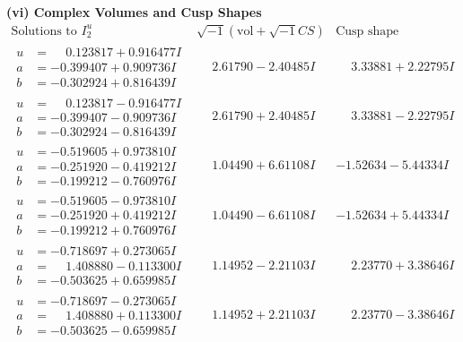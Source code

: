 \documentclass[1p]{elsarticle_modified}
\theoremstyle{definition}
\newcommand{\I}{\sqrt{-1}}
\begin{document}
\newpage\flushleft \textbf{(vi) Complex Volumes and Cusp Shapes}
$$\begin{array}{c|c|c}  
\text{Solutions to }I^u_{2}& \I (\text{vol} + \sqrt{-1}CS) & \text{Cusp shape}\\
 \hline 
\begin{aligned}
u &= \phantom{-}0.123817 + 0.916477 I \\
a &= -0.399407 + 0.909736 I \\
b &= -0.302924 + 0.816439 I\end{aligned}
 & \phantom{-}2.61790 - 2.40485 I & \phantom{-}3.33881 + 2.22795 I \\ \hline\begin{aligned}
u &= \phantom{-}0.123817 - 0.916477 I \\
a &= -0.399407 - 0.909736 I \\
b &= -0.302924 - 0.816439 I\end{aligned}
 & \phantom{-}2.61790 + 2.40485 I & \phantom{-}3.33881 - 2.22795 I \\ \hline\begin{aligned}
u &= -0.519605 + 0.973810 I \\
a &= -0.251920 - 0.419212 I \\
b &= -0.199212 - 0.760976 I\end{aligned}
 & \phantom{-}1.04490 + 6.61108 I & -1.52634 - 5.44334 I \\ \hline\begin{aligned}
u &= -0.519605 - 0.973810 I \\
a &= -0.251920 + 0.419212 I \\
b &= -0.199212 + 0.760976 I\end{aligned}
 & \phantom{-}1.04490 - 6.61108 I & -1.52634 + 5.44334 I \\ \hline\begin{aligned}
u &= -0.718697 + 0.273065 I \\
a &= \phantom{-}1.408880 - 0.113300 I \\
b &= -0.503625 + 0.659985 I\end{aligned}
 & \phantom{-}1.14952 - 2.21103 I & \phantom{-}2.23770 + 3.38646 I \\ \hline\begin{aligned}
u &= -0.718697 - 0.273065 I \\
a &= \phantom{-}1.408880 + 0.113300 I \\
b &= -0.503625 - 0.659985 I\end{aligned}
 & \phantom{-}1.14952 + 2.21103 I & \phantom{-}2.23770 - 3.38646 I \\ \hline\begin{aligned}

\end{aligned}
\end{array}$$
\end{document}
